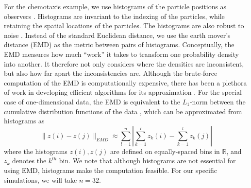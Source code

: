 \documentclass[preprint]{elsarticle}
\begin{document}
For the chemotaxis example, we use histograms of the particle positions as observers \cite{talmon2013empirical}. 
%
Histograms are invariant to the indexing of the particles, while retaining the spatial locations of the particles.
%
The histograms are also robust to noise \cite{talmon2013empirical}. 
%
Instead of the standard Euclidean distance, we use the earth mover's distance (EMD) \cite{rubner2000earth} as the metric between pairs of histograms. 
%
Conceptually, the EMD measures how much ``work'' it takes to transform one probability density into another.
%
It therefore not only considers where the densities are inconsistent, but also how far apart the inconsistencies are.
%
Although the brute-force computation of the EMD is computationally expensive, there has been a plethora of work in developing efficient algorithms for its approximation \cite{Pele-eccv2008, Pele-iccv2009}.
%
For the special case of one-dimensional data, the EMD is equivalent to the $L_1$-norm between the cumulative distribution functions of the data \cite{rubner2000perceptual}, which can be approximated from histograms as
\begin{equation}
\| z(i) - z(j) \|_{EMD} \approx \sum_{l=1}^{n} \left| \sum_{k=1}^l z_k(i) - \sum_{k=1}^l z_k(j) \right|
\end{equation}
where the histograms $z(i), z(j)$ are defined on equally-spaced bins in $\mathbb{R}$, and $z_k$ denotes the $k^{th}$ bin. 
%
We note that although histograms are not essential for using EMD, histograms make the computation feasible. 
%
For our specific simulations, we will take $n=32$. 
\end{document}
